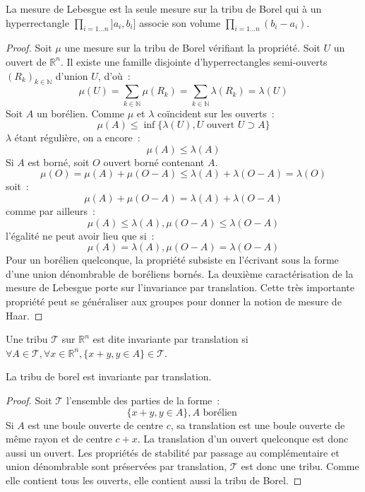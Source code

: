 \begin{prop}
La mesure de Lebesgue est la seule mesure sur la tribu de Borel qui à
un hyperrectangle $\prod_{i=1\dots n} ]a_i, b_i]$ associe son volume
$\prod_{i=1\dots n} (b_i - a_i)$.
\end{prop}

\begin{proof}
Soit $\mu$ une mesure sur la tribu de Borel vérifiant la
propriété. Soit $U$ un ouvert de $\mathbb{R}^n$. Il existe une famille
disjointe d'hyperrectangles semi-ouverts $(R_k)_{k \in \mathbb{N}}$ d'union $U$, d'où~:
\[
\mu(U) = \sum_{k \in \mathbb{N}} \mu(R_k) = \sum_{k\in \mathbb{N}}  \lambda(R_k) = \lambda(U) 
\]
Soit $A$ un borélien. Comme $\mu$ et $\lambda$ coïncident sur les
ouverts~:
\[
\mu(A) \leq \inf \{ \lambda(U), U \mbox{ ouvert } U \supset A \}
\]
$\lambda$ étant régulière, on a encore~:
\[
\mu(A) \leq \lambda(A)
\]
Si $A$ est borné, soit $O$ ouvert borné contenant $A$.
\[
\mu(O) = \mu(A) + \mu(O-A)  \leq \lambda(A) + \lambda(O-A) = \lambda(O)
\]
soit~:
\[
\mu(A) + \mu(O-A)  = \lambda(A) + \lambda(O-A)
\]
comme par ailleurs~:
\[
\mu(A) \leq \lambda(A), \mu(O-A) \leq \lambda(O-A)
\]
l'égalité ne peut avoir lieu que si~:
\[
\mu(A) = \lambda(A), \mu(O-A) = \lambda(O-A)
\]
Pour un borélien quelconque, la propriété subsiste en l'écrivant sous
la forme d'une union dénombrable de boréliens bornés.
La deuxième caractérisation de la mesure de Lebesgue porte sur
l'invariance par translation. Cette très importante propriété peut se
généraliser aux groupes pour donner la notion de mesure de Haar. 
\end{proof}
\begin{defn}
Une tribu $\mathcal{T}$ sur $\mathbb{R}^n$ est dite invariante par
translation si $\forall A \in \mathcal{T}, \forall x \in \mathbb{R}^n,
\{ x + y, y \in A \} \in \mathcal{T}$.
\end{defn}
\begin{prop}
La tribu de borel est invariante par translation.
\end{prop}
\begin{proof}
Soit $\mathcal{T}$ l'ensemble des parties de la forme~:
\[
\{ x + y, y \in A \}, A \mbox{ borélien }
\]
Si $A$ est une boule ouverte de centre $c$, sa translation est une
boule ouverte de même rayon et de centre $c+x$. La translation d'un
ouvert quelconque est donc aussi un ouvert. 
Les propriétés de stabilité par passage au complémentaire et union
dénombrable sont préservées par translation, $\mathcal{T}$ est donc
une tribu. Comme elle contient tous les ouverts, elle
contient aussi la tribu de Borel.
\end{proof}
